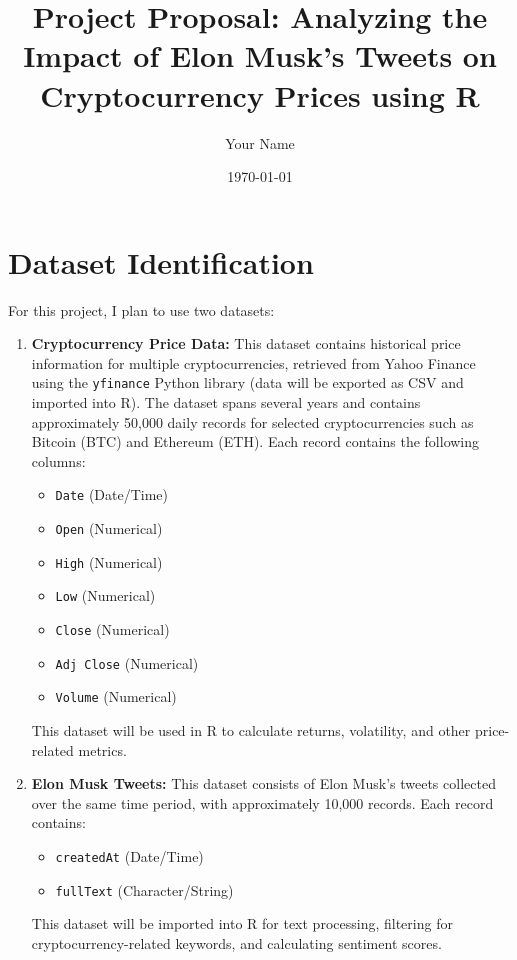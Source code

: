 \documentclass[12pt]{article}
\title{Project Proposal: Analyzing the Impact of Elon Musk's Tweets on Cryptocurrency Prices using R}
\author{Your Name}
\date{\today}
\begin{document}
\maketitle

\section*{Dataset Identification}

For this project, I plan to use two datasets:

\begin{enumerate}[label=\arabic*.]
    \item \textbf{Cryptocurrency Price Data:}  
    This dataset contains historical price information for multiple cryptocurrencies, retrieved from Yahoo Finance using the \texttt{yfinance} Python library (data will be exported as CSV and imported into R). The dataset spans several years and contains approximately 50,000 daily records for selected cryptocurrencies such as Bitcoin (BTC) and Ethereum (ETH). Each record contains the following columns:
    \begin{itemize}
        \item \texttt{Date} (Date/Time)
        \item \texttt{Open} (Numerical)
        \item \texttt{High} (Numerical)
        \item \texttt{Low} (Numerical)
        \item \texttt{Close} (Numerical)
        \item \texttt{Adj Close} (Numerical)
        \item \texttt{Volume} (Numerical)
    \end{itemize}
    This dataset will be used in R to calculate returns, volatility, and other price-related metrics.

    \item \textbf{Elon Musk Tweets:}  
    This dataset consists of Elon Musk's tweets collected over the same time period, with approximately 10,000 records. Each record contains:
    \begin{itemize}
        \item \texttt{createdAt} (Date/Time)
        \item \texttt{fullText} (Character/String)
    \end{itemize}
    This dataset will be imported into R for text processing, filtering for cryptocurrency-related keywords, and calculating sentiment scores.
\end{enumerate}
\end{document}
